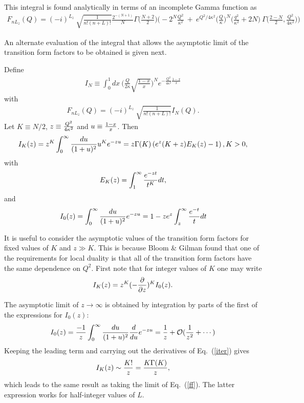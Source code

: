 \documentclass[aps,prd,amsmath,longbibliography]{revtex4-1}
\newcommand{\eq}[1]{Eq.~(\ref{#1})}
\def\bea{\begin{eqnarray}}
\def\eea{\end{eqnarray}}\def\a{\alpha}\newcommand{\bfk}{{\bf k}}\newcommand{\bfq}{{\bf q}}
\begin{document}
{	This integral is found analytically in terms of an incomplete Gamma function as %
	\bea  F_{nL_z}(Q) =(- i)^{L_z} \ \sqrt{\frac{1}{n!(n+L)!}}\frac{2^{-(N+1)}}{N}\Gamma\Big( \frac{N+2}{2} \Big)\Bigg( -2^{N}\frac{Q^2}{\kappa^2} \ + \  e^{Q^2/4\kappa^2}\Big(\frac{Q}{\kappa}\Big)^{N}\Big( \frac{q^2}{\kappa^2} + 2N \Big) \ \Gamma\Big(\frac{2-N}{2}, \frac{Q^2}{4\kappa^2}\Big)\Bigg)\label{ff} \eea


An alternate evaluation of the integral  that allows the asymptotic limit of the transition form factors to be obtained is given next.

 





 
 Define \bea I_N\equiv  \int_{0}^{1}dx \ \bigg( \frac{Q}{2\kappa}\sqrt{\frac{1-x}{x}} \bigg)^N  e^{-\frac{Q^2}{4\kappa^2}\frac{1-x}{x}}\eea
with \bea F_{nL_z}(Q)=(- i)^{L_z} \ \sqrt{\frac{1}{n!(n+L)!}}I_N(Q).\label{FNL}\eea
 Let $K\equiv N/2$, $z\equiv  {Q^2\over 4\kappa^2}$ and $u\equiv {1-x\over x}$. Then
 \bea I_K(z)=z^K \int_0^\infty {du\over (1+u)^2}u^K e^{-z u}=z \Gamma (K) \left(e^z (K+z) E_K(z)-1\right), K>0,\eea
 with
 \bea E_K(z)=\int_1^\infty {e^{-zt}\over t^K}dt,\eea
 and
 \bea I_0(z)= \int_0^\infty {du\over (1+u)^2} e^{-z u}=1-z  e^z \int_{z}^\infty{e^{-t}\over t}dt\label{i0}\eea

It is useful to consider the asymptotic values of the transition form factors for fixed values    of $K$ and $z\gg K$. This is because Bloom \& Gilman found that one of the requirements for local duality is that all of the transition form factors have the same dependence on $Q^2$.
 First note that for integer values of $K$ one may write 
\bea I_K(z)=z^K (-{\partial\over \partial z})^K I_0(z).\label{iter}\eea

The asymptotic limit of $z\to\infty$ is obtained by integration by parts of the first of the expressions for $I_0(z)$:
\bea  I_0(z)={-1\over z}\int_0^\infty {du\over (1+u)^2} {d\over du}e^{-z u}={1\over z} +{\cal O }({1\over z^2}+\cdots)\eea
Keeping the leading term and carrying out the derivatives of \eq{iter} gives
\bea I_K(z) \sim {K!\over z}={K\G(K)\over z},\label{limx}\eea which leads to the  same result as taking the limit of \eq{ff}. The latter expression works for half-integer values of $L$.

}
\end{document}
